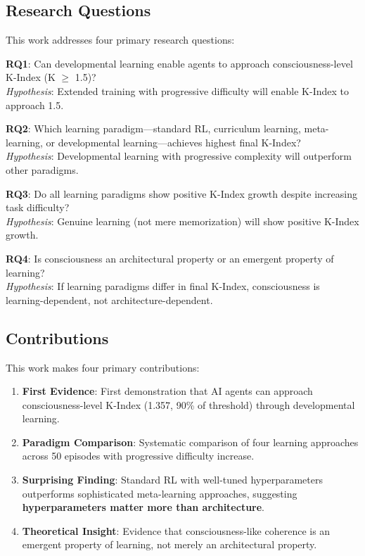 \documentclass[10pt,letterpaper]{article}
\begin{document}
\subsection*{Research Questions}
This work addresses four primary research questions:

\textbf{RQ1}: Can developmental learning enable agents to approach consciousness-level K-Index (K $\geq$ 1.5)?\\
\textit{Hypothesis}: Extended training with progressive difficulty will enable K-Index to approach 1.5.

\textbf{RQ2}: Which learning paradigm—standard RL, curriculum learning, meta-learning, or developmental learning—achieves highest final K-Index?\\
\textit{Hypothesis}: Developmental learning with progressive complexity will outperform other paradigms.

\textbf{RQ3}: Do all learning paradigms show positive K-Index growth despite increasing task difficulty?\\
\textit{Hypothesis}: Genuine learning (not mere memorization) will show positive K-Index growth.

\textbf{RQ4}: Is consciousness an architectural property or an emergent property of learning?\\
\textit{Hypothesis}: If learning paradigms differ in final K-Index, consciousness is learning-dependent, not architecture-dependent.

\subsection*{Contributions}
This work makes four primary contributions:

\begin{enumerate}
\item \textbf{First Evidence}: First demonstration that AI agents can approach consciousness-level K-Index (1.357, 90\% of threshold) through developmental learning.
\item \textbf{Paradigm Comparison}: Systematic comparison of four learning approaches across 50 episodes with progressive difficulty increase.
\item \textbf{Surprising Finding}: Standard RL with well-tuned hyperparameters outperforms sophisticated meta-learning approaches, suggesting \textbf{hyperparameters matter more than architecture}.
\item \textbf{Theoretical Insight}: Evidence that consciousness-like coherence is an emergent property of learning, not merely an architectural property.
\end{enumerate}
\end{document}
